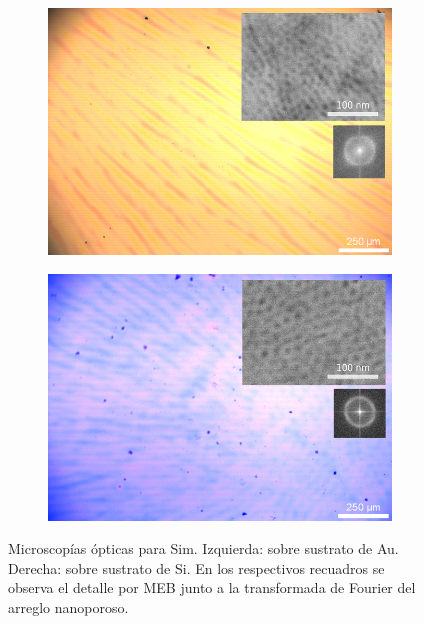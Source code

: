         \begin{figure}[th!]          
 	   	    \begin{subfigure}{0.495\textwidth}
	       	\includegraphics[width=\textwidth]{Imagenes/Au_EtF127-Combinada.jpg}
	   		\end{subfigure}
	   		\begin{subfigure}{0.495\textwidth}
	   	    \includegraphics[width=\textwidth]{Imagenes/Si_EtF127-Combinada.jpg}
	   		\end{subfigure}
			 \caption[Microscopías \pdmF\space tratamiento simplificado.]{Microscopías ópticas para Sim\pdmF. Izquierda: sobre sustrato de Au. Derecha: sobre sustrato de Si. En los respectivos recuadros se observa el detalle por MEB junto a la transformada de Fourier del arreglo nanoporoso.}

\end{figure}
